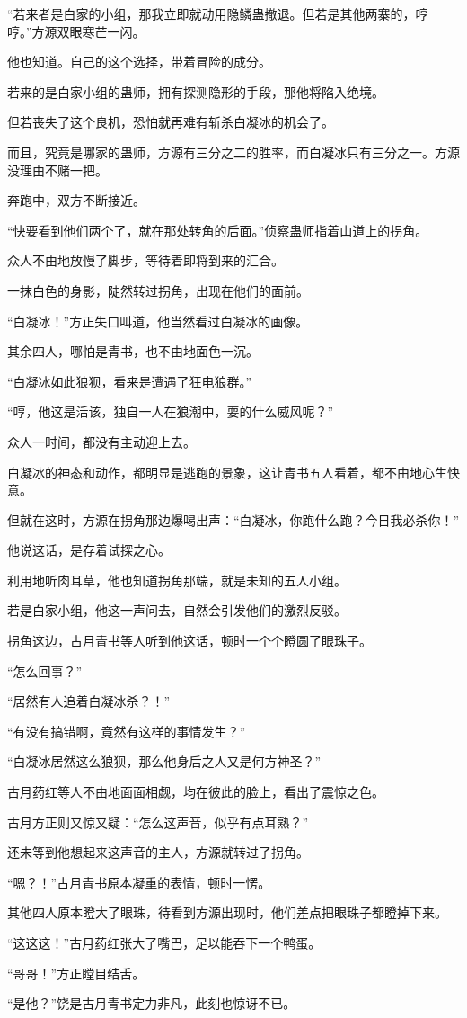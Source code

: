 \begin{this_body}
“若来者是白家的小组，那我立即就动用隐鳞蛊撤退。但若是其他两寨的，哼哼。”方源双眼寒芒一闪。

他也知道。自己的这个选择，带着冒险的成分。

若来的是白家小组的蛊师，拥有探测隐形的手段，那他将陷入绝境。

但若丧失了这个良机，恐怕就再难有斩杀白凝冰的机会了。

而且，究竟是哪家的蛊师，方源有三分之二的胜率，而白凝冰只有三分之一。方源没理由不赌一把。

奔跑中，双方不断接近。

“快要看到他们两个了，就在那处转角的后面。”侦察蛊师指着山道上的拐角。

众人不由地放慢了脚步，等待着即将到来的汇合。

一抹白色的身影，陡然转过拐角，出现在他们的面前。

“白凝冰！”方正失口叫道，他当然看过白凝冰的画像。

其余四人，哪怕是青书，也不由地面色一沉。

“白凝冰如此狼狈，看来是遭遇了狂电狼群。”

“哼，他这是活该，独自一人在狼潮中，耍的什么威风呢？”

众人一时间，都没有主动迎上去。

白凝冰的神态和动作，都明显是逃跑的景象，这让青书五人看着，都不由地心生快意。

但就在这时，方源在拐角那边爆喝出声：“白凝冰，你跑什么跑？今日我必杀你！”

他说这话，是存着试探之心。

利用地听肉耳草，他也知道拐角那端，就是未知的五人小组。

若是白家小组，他这一声问去，自然会引发他们的激烈反驳。

拐角这边，古月青书等人听到他这话，顿时一个个瞪圆了眼珠子。

“怎么回事？”

“居然有人追着白凝冰杀？！”

“有没有搞错啊，竟然有这样的事情发生？”

“白凝冰居然这么狼狈，那么他身后之人又是何方神圣？”

古月药红等人不由地面面相觑，均在彼此的脸上，看出了震惊之色。

古月方正则又惊又疑：“怎么这声音，似乎有点耳熟？”

还未等到他想起来这声音的主人，方源就转过了拐角。

“嗯？！”古月青书原本凝重的表情，顿时一愣。

其他四人原本瞪大了眼珠，待看到方源出现时，他们差点把眼珠子都瞪掉下来。

“这这这！”古月药红张大了嘴巴，足以能吞下一个鸭蛋。

“哥哥！”方正瞠目结舌。

“是他？”饶是古月青书定力非凡，此刻也惊讶不已。

\end{this_body}

